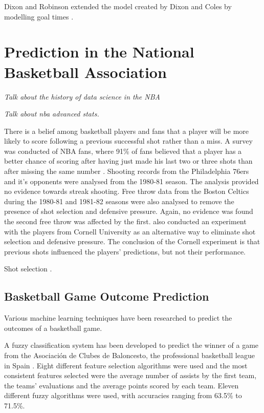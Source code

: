 Dixon and Robinson extended the model created by Dixon and Coles by modelling goal times \citep{dixon_robinson}.

\section{Prediction in the National Basketball Association}
\textit{Talk about the history of data science in the NBA}

\textit{Talk about nba advanced stats.}

There is a belief among basketball players and fans that a player will be more likely to score following a previous successful shot rather than a miss.  A survey was conducted of NBA fans, where 91\% of fans believed that a player has a better chance of scoring after having just made his last two or three shots than after missing the same number \citep{nba_hot_hand}.  Shooting records from the Philadelphia 76ers and it's opponents were analysed from the 1980-81 season.   The analysis provided no evidence towards streak shooting.  Free throw data from the Boston Celtics during the 1980-81 and 1981-82 seasons were also analysed to remove the presence of shot selection and defensive pressure.  Again, no evidence was found the second free throw was affected by the first.  \citep{nba_hot_hand} also conducted an experiment with the players from Cornell University as an alternative way to eliminate shot selection and defensive pressure.  The conclusion of the Cornell experiment is that previous shots influenced the players' predictions, but not their performance.  

Shot selection \cite{nba_spatial_analysis}.


\subsection{Basketball Game Outcome Prediction}

Various machine learning techniques have been researched to predict the outcomes of a basketball game.

A fuzzy classification system has been developed to predict the winner of a game from the Asociaci\'on de Clubes de Baloncesto, the professional basketball league in Spain \citep{nba_fuzzy_prediction}.  Eight different feature selection algorithms were used and the most consistent features selected were the average number of assists by the first team, the teams' evaluations and the average points scored by each team.  Eleven different fuzzy algorithms were used, with accuracies ranging from 63.5\% to 71.5\%.


